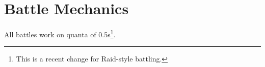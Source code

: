\chapter{Battle Mechanics}
\label{chap:battle}
All battles work on quanta of 0.5s\footnote{This is a recent change for Raid-style battling.}.
